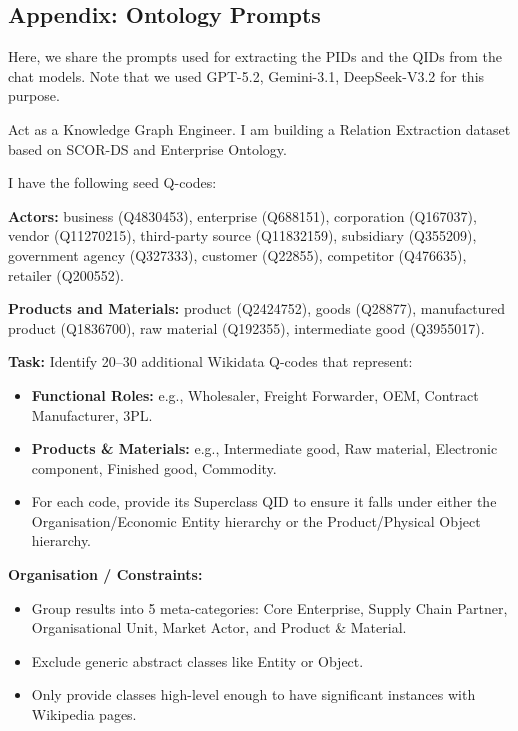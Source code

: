 \begin{appendices}


\chapter{Appendix: Ontology Prompts}
\thispagestyle{plain}
\label{app:ontology_prompt}

Here, we share the prompts used for extracting the PIDs and the QIDs from the chat models. Note that we used GPT-5.2, Gemini-3.1, DeepSeek-V3.2 for this purpose.


\begin{tcolorbox}[promptbox, title=Entity QID Extraction Prompt]
Act as a Knowledge Graph Engineer. I am building a Relation Extraction
dataset based on SCOR-DS and Enterprise Ontology.

I have the following seed Q-codes:

\textbf{Actors:} business (Q4830453), enterprise (Q688151), corporation
(Q167037), vendor (Q11270215), third-party source (Q11832159), subsidiary
(Q355209), government agency (Q327333), customer (Q22855), competitor
(Q476635), retailer (Q200552).

\textbf{Products and Materials:} product (Q2424752), goods (Q28877),
manufactured product (Q1836700), raw material (Q192355), intermediate
good (Q3955017).

\medskip
\textbf{Task:} Identify 20--30 additional Wikidata Q-codes that represent:

\begin{itemize}
    \item \textbf{Functional Roles:} e.g., Wholesaler, Freight Forwarder,
    OEM, Contract Manufacturer, 3PL.
    \item \textbf{Products \& Materials:} e.g., Intermediate good, Raw
    material, Electronic component, Finished good, Commodity.
    \item For each code, provide its Superclass QID to ensure it falls
    under either the Organisation/Economic Entity hierarchy or the
    Product/Physical Object hierarchy.
\end{itemize}

\medskip
\textbf{Organisation / Constraints:}

\begin{itemize}
    \item Group results into 5 meta-categories: Core Enterprise, Supply
    Chain Partner, Organisational Unit, Market Actor, and Product \&
    Material.
    \item Exclude generic abstract classes like Entity or Object.
    \item Only provide classes high-level enough to have significant
    instances with Wikipedia pages.
\end{itemize}
\end{tcolorbox}


\end{appendices}
